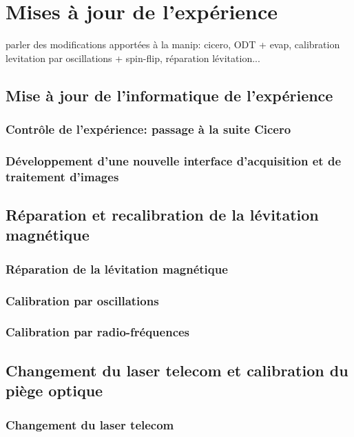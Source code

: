 \chapter{Mises à jour de l'expérience}
\label{ch:new_exp}


parler des modifications apportées à la manip: cicero, ODT + evap, calibration levitation par oscillations + spin-flip, réparation lévitation...

\section{Mise à jour de l'informatique de l'expérience}
\subsection{Contrôle de l'expérience: passage à la suite Cicero}
\label{sc:cicero}
\subsection{Développement d'une nouvelle interface d'acquisition et de traitement d'images}

\section{Réparation et recalibration de la lévitation magnétique}
\subsection{Réparation de la lévitation magnétique}
\subsection{Calibration par oscillations}
\subsection{Calibration par radio-fréquences}

\section{Changement du laser telecom et calibration du piège optique}
\subsection{Changement du laser telecom}
